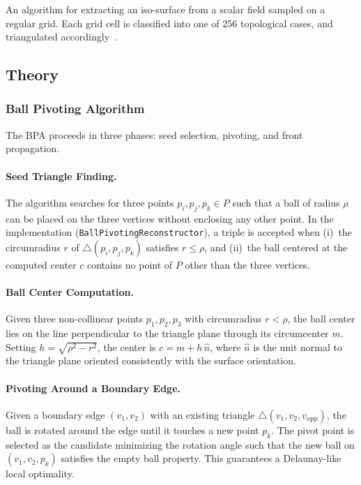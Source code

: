\begin{definition}\label{def:marching_cubes}
An algorithm for extracting an iso-surface from a scalar field sampled on a regular grid. Each grid cell is classified into one of 256 topological cases, and triangulated accordingly~\cite{lorensen1987}.
\end{definition}

\subsection{Theory}

\subsubsection{Ball Pivoting Algorithm}

The BPA proceeds in three phases: seed selection, pivoting, and front propagation.

\paragraph{Seed Triangle Finding.}
The algorithm searches for three points $p_i, p_j, p_k \in P$ such that a ball of radius $\rho$ can be placed on the three vertices without enclosing any other point. In the implementation (\texttt{BallPivotingReconstructor}), a triple is accepted when (i)~the circumradius $r$ of $\triangle(p_i, p_j, p_k)$ satisfies $r \leq \rho$, and (ii)~the ball centered at the computed center $c$ contains no point of $P$ other than the three vertices.

\paragraph{Ball Center Computation.}
Given three non-collinear points $p_1, p_2, p_3$ with circumradius $r < \rho$, the ball center lies on the line perpendicular to the triangle plane through its circumcenter $m$. Setting $h = \sqrt{\rho^2 - r^2}$, the center is $c = m + h\,\hat{n}$, where $\hat{n}$ is the unit normal to the triangle plane oriented consistently with the surface orientation.

\paragraph{Pivoting Around a Boundary Edge.}
Given a boundary edge $(v_1, v_2)$ with an existing triangle $\triangle(v_1, v_2, v_\text{opp})$, the ball is rotated around the edge until it touches a new point $p_k$. The pivot point is selected as the candidate minimizing the rotation angle such that the new ball on $(v_1, v_2, p_k)$ satisfies the empty ball property. This guarantees a Delaunay-like local optimality.

